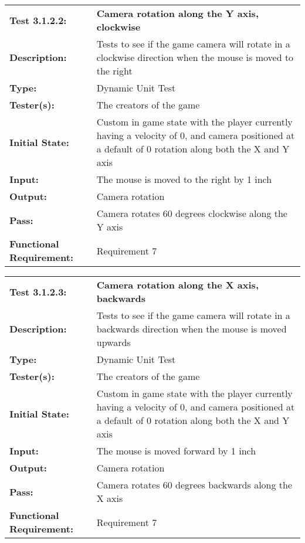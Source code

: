 \documentclass[12pt, titlepage]{article}
\begin{document}
\begin{mdframed}[linewidth=1pt]
\begin{tabularx}{\textwidth}{@{}p{3cm}X@{}}
{\bf Test 3.1.2.2:} & {\bf Camera rotation along the Y axis, clockwise}\\[\baselineskip]
{\bf Description:} & Tests to see if the game camera will rotate in a clockwise direction when the mouse is moved to the right\\[0.5\baselineskip]
{\bf Type:} & Dynamic Unit Test\\[0.5\baselineskip]
{\bf Tester(s):} & The creators of the game\\[0.5\baselineskip]
{\bf Initial State:} & Custom in game state with the player currently having a velocity of 0, and camera positioned at a default of 0 rotation along both the X and Y axis\\[0.5\baselineskip]
{\bf Input:} & The mouse is moved to the right by 1 inch\\[0.5\baselineskip]
{\bf Output:} & Camera rotation\\[0.5\baselineskip]
{\bf Pass:} & Camera rotates 60 degrees clockwise along the Y axis \\[0.5\baselineskip]
{\bf Functional Requirement:} & Requirement 7
\end{tabularx}
\end{mdframed}

\begin{mdframed}[linewidth=1pt]
\begin{tabularx}{\textwidth}{@{}p{3cm}X@{}}
{\bf Test 3.1.2.3:} & {\bf Camera rotation along the X axis, backwards}\\[\baselineskip]
{\bf Description:} & Tests to see if the game camera will rotate in a backwards direction when the mouse is moved upwards\\[0.5\baselineskip]
{\bf Type:} & Dynamic Unit Test\\[0.5\baselineskip]
{\bf Tester(s):} & The creators of the game\\[0.5\baselineskip]
{\bf Initial State:} & Custom in game state with the player currently having a velocity of 0, and camera positioned at a default of 0 rotation along both the X and Y axis\\[0.5\baselineskip]
{\bf Input:} & The mouse is moved forward by 1 inch\\[0.5\baselineskip]
{\bf Output:} & Camera rotation\\[0.5\baselineskip]
{\bf Pass:} & Camera rotates 60 degrees backwards along the X axis \\[0.5\baselineskip]
{\bf Functional Requirement:} & Requirement 7
\end{tabularx}
\end{mdframed}
\end{document}
